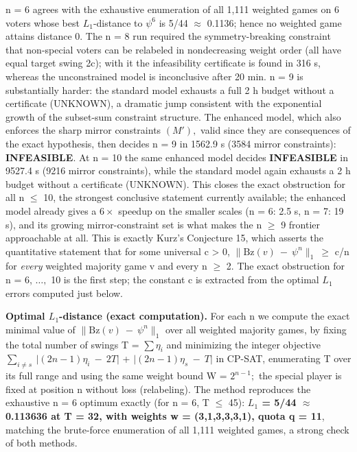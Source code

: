 \documentclass[
]{article}
\begin{document}
n = 6 agrees with the exhaustive enumeration of all 1,111 weighted games
on 6 voters whose best \(L_1\)-distance to \(\psi^6\) is 5/44
\(\approx\) 0.1136; hence no weighted game attains distance 0. The n = 8
run required the symmetry-breaking constraint that non-special voters
can be relabeled in nondecreasing weight order (all have equal target
swing 2c); with it the infeasibility certificate is found in 316 s,
whereas the unconstrained model is inconclusive after 20 min. n = 9 is
substantially harder: the standard model exhausts a full 2 h budget
without a certificate (UNKNOWN), a dramatic jump consistent with the
exponential growth of the subset-sum constraint structure. The enhanced
model, which also enforces the sharp mirror constraints \((M'),\) valid
since they are consequences of the exact hypothesis, then decides n = 9
in 1562.9 s (3584 mirror constraints): \textbf{INFEASIBLE}. At n = 10
the same enhanced model decides \textbf{INFEASIBLE} in 9527.4 s (9216
mirror constraints), while the standard model again exhausts a 2 h
budget without a certificate (UNKNOWN). This closes the exact
obstruction for all n \(\le\) 10, the strongest conclusive statement
currently available; the enhanced model already gives a \(6\times\)
speedup on the smaller scales (n = 6: 2.5 s, n = 7: 19 s), and its
growing mirror-constraint set is what makes the n \(\ge\) 9 frontier
approachable at all. This is exactly Kurz's Conjecture 15, which asserts
the quantitative statement that for some universal c \textgreater{} 0,
\(\|\mathrm{Bz}(v)\ -\ \psi^n\|_1\ \ge\) c/n for \emph{every} weighted
majority game v and every n \(\ge\) 2. The exact obstruction for n = 6,
\(\dots,\) 10 is the first step; the constant c is extracted from the
optimal \(L_1\) errors computed just below.

\textbf{Optimal \(L_1\)-distance (exact computation).} For each n we
compute the exact minimal value of \(\|\mathrm{Bz}(v)\ -\ \psi^n\|_1\)
over all weighted majority games, by fixing the total number of swings T
= \(\sum\eta_i\) and minimizing the integer objective
\(\sum_{i\ne s}\ \vert(2n-1)\eta_i\ -\ 2T\vert\) +
\(\vert(2n-1)\eta_s\ -\ T\vert\) in CP-SAT, enumerating T over its full
range and using the same weight bound W = \(2^{n-1};\) the special
player is fixed at position n without loss (relabeling). The method
reproduces the exhaustive n = 6 optimum exactly (for n = 6, T \(\le\)
45): \textbf{\(L_1\) = 5/44 \(\approx\) 0.113636 at T = 32, with weights
w = (3,1,3,3,3,1), quota q = 11}, matching the brute-force enumeration
of all 1,111 weighted games, a strong check of both methods.
\end{document}
